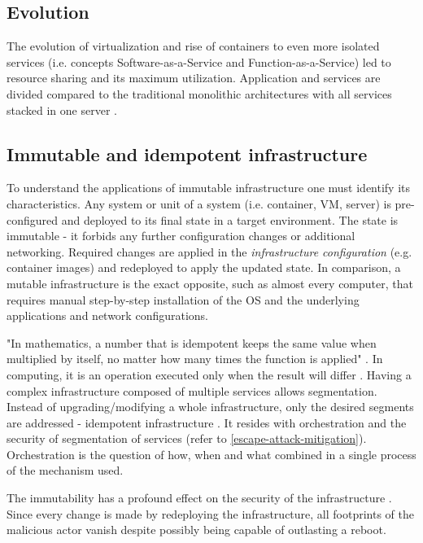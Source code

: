 \documentclass[12pt,a4paper,twoside]{report}
\begin{document}
\subsection{Evolution}
The evolution of virtualization and rise of containers to even more isolated services (i.e. concepts Software-as-a-Service and Function-as-a-Service) led to resource sharing and its maximum utilization. Application and services are divided compared to the traditional monolithic architectures with all services stacked in one server \cite{research:microservices}.

\subsection{Immutable and idempotent infrastructure}

To understand the applications of immutable infrastructure one must identify its characteristics. Any system or unit of a system (i.e. container, VM, server) is pre-configured and deployed to its final state in a target environment. The state is immutable - it forbids any further configuration changes or additional networking. Required changes are applied in the \emph{infrastructure configuration} (e.g. container images) and redeployed to apply the updated state. In comparison, a mutable infrastructure is the exact opposite, such as almost every computer, that requires manual step-by-step installation of the OS and the underlying applications and network configurations.

"In mathematics, a number that is idempotent keeps the same value when multiplied by itself, no matter how many times the function is applied" \cite{research:idempotence:math}. In computing, it is an operation executed only when the result will differ \cite{research:idempotence:it}. Having a complex infrastructure composed of multiple services allows segmentation. Instead of upgrading/modifying a whole infrastructure, only the desired segments are addressed - idempotent infrastructure \cite{research:ansible-idempotence}. It resides with orchestration and the security of segmentation of services (refer to \autoref{escape-attack-mitigation}). Orchestration is the question of how, when and what combined in a single process of the mechanism used.

The immutability has a profound effect on the security of the infrastructure \cite{research:blog:immutablity-pros}. Since every change is made by redeploying the infrastructure, all footprints of the malicious actor vanish despite possibly being capable of outlasting a reboot.
\end{document}
